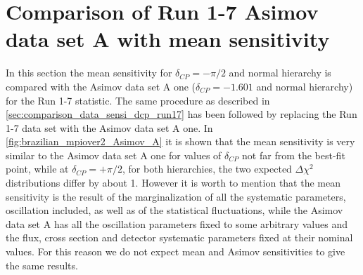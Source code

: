
%
%


\section {Comparison of Run 1-7 Asimov data set A with mean sensitivity}
\label{app:brazilian_asimov_mean_dcp_run17}


In this section the mean sensitivity for $\delta_{CP} = -\pi /2$ and normal hierarchy
is compared with the Asimov data set A one ($\delta_{CP} = -1.601$ and normal hierarchy) 
for the Run 1-7 statistic.
The same procedure as described in \cref{sec:comparison_data_sensi_dcp_run17} has been followed
by replacing the Run 1-7 data set with the Asimov data set A one.
In \cref{fig:brazilian_mpiover2_Asimov_A} it is shown that the mean sensitivity is very 
similar to the Asimov data set A one 
for values of $\delta_{CP}$ not far from the best-fit point,
while at $\delta_{CP} = +\pi/2$, for both hierarchies, the two expected 
$\Delta \chi^2$ distributions differ by about 1.
However it is worth to mention that the mean sensitivity is the result of the marginalization
of all the systematic parameters, oscillation included,
as well as of the statistical fluctuations,
while the Asimov data set A has 
all the oscillation parameters fixed to some arbitrary values
and the flux, cross section and detector systematic parameters fixed at their nominal values.
For this reason we do not expect mean and Asimov sensitivities to 
give the same results.

